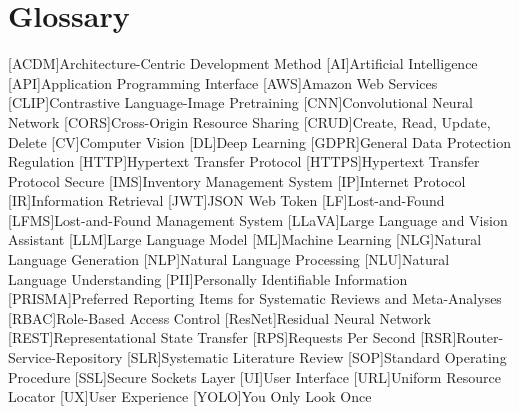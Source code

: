 \chapter{Glossary}

\footnotesize
\DoubleSpacing

\begin{multicols}{2}
\begin{acronym}[]
	[ACDM]{Architecture-Centric Development Method}
	[AI]{Artificial Intelligence}
	[API]{Application Programming Interface}
	[AWS]{Amazon Web Services}
	[CLIP]{Contrastive Language-Image Pretraining}
	[CNN]{Convolutional Neural Network}
	[CORS]{Cross-Origin Resource Sharing}
	[CRUD]{Create, Read, Update, Delete}
	[CV]{Computer Vision}
	[DL]{Deep Learning}
	[GDPR]{General Data Protection Regulation}
	[HTTP]{Hypertext Transfer Protocol}
	[HTTPS]{Hypertext Transfer Protocol Secure}
	[IMS]{Inventory Management System}
	[IP]{Internet Protocol}
	[IR]{Information Retrieval}
	[JWT]{JSON Web Token}
	[LF]{Lost-and-Found}
	[LFMS]{Lost-and-Found Management System}
	[LLaVA]{Large Language and Vision Assistant}
	[LLM]{Large Language Model}
	[ML]{Machine Learning}
	[NLG]{Natural Language Generation}
	[NLP]{Natural Language Processing}
	[NLU]{Natural Language Understanding}
	[PII]{Personally Identifiable Information}
	[PRISMA]{Preferred Reporting Items for Systematic Reviews and Meta-Analyses}
	[RBAC]{Role-Based Access Control}
	[ResNet]{Residual Neural Network}
	[REST]{Representational State Transfer}
	[RPS]{Requests Per Second}
	[RSR]{Router-Service-Repository}
	[SLR]{Systematic Literature Review}
	[SOP]{Standard Operating Procedure}
	[SSL]{Secure Sockets Layer}
	[UI]{User Interface}
	[URL]{Uniform Resource Locator}
	[UX]{User Experience}
	[YOLO]{You Only Look Once}
\end{acronym}
\end{multicols}

